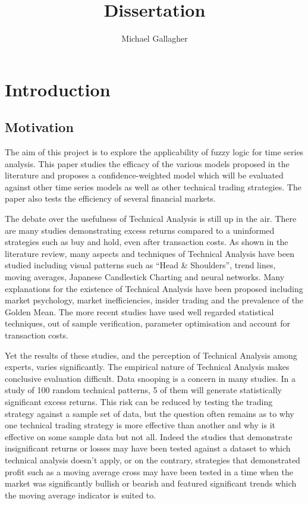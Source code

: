 \documentclass{article}
\title{Dissertation}
\author{Michael Gallagher}
\theoremstyle{definition}
\begin{document}
\maketitle



\tableofcontents

\section{Introduction}

\subsection{Motivation}

The aim of this project is to explore the applicability of fuzzy logic for time series analysis. This paper studies the efficacy of the various models proposed in the literature and proposes a confidence-weighted model which will be evaluated against other time series models as well as other technical trading strategies. The paper also tests the efficiency of several financial markets. 

The debate over the usefulness of Technical Analysis is still up in the air. There are many studies demonstrating excess returns compared to a uninformed strategies such as buy and hold, even after transaction costs. As shown in the literature review, many aspects and techniques of Technical Analysis have been studied including visual patterns such as ``Head \& Shoulders'', trend lines, moving averages, Japanese Candlestick Charting and neural networks. Many explanations for the existence of Technical Analysis have been proposed including market psychology, market inefficiencies, insider trading and the prevalence of the Golden Mean. The more recent studies have used well regarded statistical techniques, out of sample verification, parameter optimisation and account for transaction costs.

Yet the results of these studies, and the perception of Technical Analysis among experts, varies significantly. The empirical nature of Technical Analysis makes conclusive evaluation difficult. Data snooping is a concern in many studies. In a study of 100 random technical patterns, 5 of them will generate statistically significant excess returns. This risk can be reduced by testing the trading strategy against a sample set of data, but the question often remains as to why one technical trading strategy is more effective than another and why is it effective on some sample data but not all. Indeed the studies that demonstrate insignificant returns or losses may have been tested against a dataset to which technical analysis doesn't apply, or on the contrary, strategies that demonstrated profit such as a moving average cross may have been tested in a time when the market was significantly bullish or bearish and featured significant trends which the moving average indicator is suited to.
\end{document}
